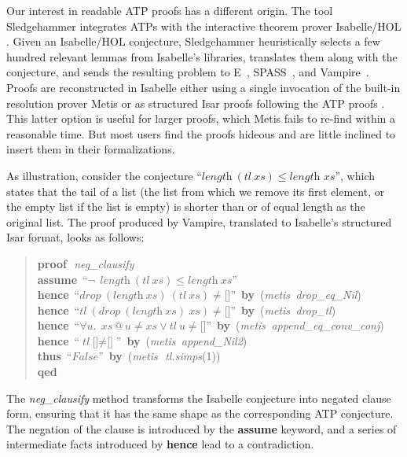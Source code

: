 \documentclass[withtimes,a4paper,12pt]{easychair}
\newcommand\keyw[1]{\textsf{\textbf{#1}}}
\begin{document}
Our interest in readable ATP proofs has a different origin. The tool
Sledgehammer \cite{meng-paulson-2008,paulson-susanto-2007} integrates
ATPs with the interactive theorem prover Isabelle/HOL
\cite{nipkow-et-al-2002}. Given an Isabelle/HOL conjecture,
Sledgehammer heuristically selects a few hundred relevant lemmas from
Isabelle's libraries, translates them along with the conjecture, and
sends the resulting problem to E~\cite{schulz-2004},
SPASS~\cite{weidenbach-2001}, and
Vampire~\cite{riazanov-voronkov-2002}.
%
Proofs are reconstructed in Isabelle either using a single invocation
of the built-in resolution prover Metis \cite{hurd-2003} or as
structured Isar \cite{wenzel-2007} proofs following the ATP proofs
\cite{paulson-susanto-2007}. This latter option is useful for larger
proofs, which Metis fails to re-find within a reasonable time. But
most users find the proofs hideous and are little inclined to
insert them in their formalizations.

As illustration, consider the conjecture ``$\textit{length}~(\textit{tl}~\textit{xs}) \le
\textit{length~xs}$'', which states that the tail of a list (the list from which
we remove its first element, or the empty list if the list is empty) is shorter
than or of equal length as the original list. The proof produced by Vampire,
translated to Isabelle's structured Isar format, looks as follows:
%
\begin{quote}
\keyw{proof}\,~\textit{neg\_clausify} \\
\hbox{}\quad \keyw{assume}\, ``$\lnot\;\, \textit{length}~(\textit{tl}~\textit{xs}) \le \textit{length}~\textit{xs}$''\\
\hbox{}\quad \keyw{hence}\, ``$\textit{drop}~(\textit{length}~\textit{xs})~(\textit{tl}~\textit{xs}) \not= \text{[]}$'' \keyw{\,by\,} (\textit{metis\, drop\_eq\_Nil\/})\\
\hbox{}\quad \keyw{hence}\, ``$\textit{tl}~(\textit{drop}~(\textit{length}~\textit{xs})~\textit{xs}) \not= \text{[]}$'' \keyw{\,by\,} (\textit{metis\, drop\_tl\/})\\
\hbox{}\quad \keyw{hence}\, ``$\forall\textit{u}.\;\, \textit{xs} \mathbin{@} \textit{u} \not= \textit{xs} \mathrel{\lor} \textit{tl}~\textit{u} \not= \text{[]}$'' \keyw{\,by\,} (\textit{metis\, append\_eq\_conv\_conj\/})\\
\hbox{}\quad \keyw{hence}\, ``$\textit{tl}~\text{[]} \not= \text{[]}$'' \keyw{\,by\,} (\textit{metis\, append\_Nil2\/})\\
\hbox{}\quad \keyw{thus}\, ``$\textit{False}$'' \keyw{\,by\,} (\textit{metis}\,~\textit{tl.simps\/}(1))\\
\keyw{qed}
\end{quote}
%
\noindent
The \textit{neg\_clausify} method transforms the Isabelle conjecture into
negated clause form, ensuring that it has the same shape as the corresponding ATP
conjecture. The negation of the clause is introduced by the
\keyw{assume} keyword, and a series of intermediate facts introduced by
\keyw{hence} lead to a contradiction.
\end{document}
